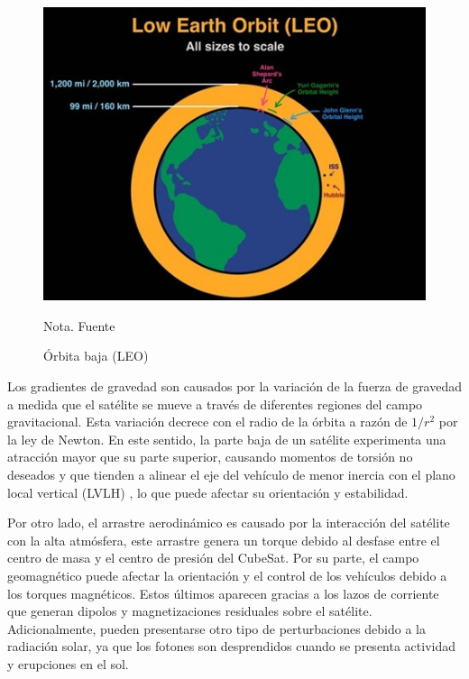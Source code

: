 \begin{figure}[!ht]
	\begin{center}
		\includegraphics[scale=1]{imagenes/marco_teorico/leo.jpg}\\
	\end{center}
	\caption{  Órbita baja (LEO)}
	\label{fig:leo}
		\footnotesize{Nota. Fuente \cite{opc:LEO}}
\end{figure}

Los gradientes de gravedad son causados por la variación de la fuerza de gravedad a medida que el satélite se mueve a través de diferentes regiones del campo gravitacional. Esta variación decrece con el radio de la órbita a razón de $1/r^2$ por la ley de Newton. En este sentido, la parte baja de un satélite experimenta una atracción mayor que su parte superior, causando momentos de torsión no deseados y que tienden a alinear el eje del vehículo de menor inercia con el plano local vertical (LVLH) \cite{griffin2004space}, lo que puede afectar su orientación y estabilidad.

Por otro lado, el arrastre aerodinámico es causado por la interacción del satélite con la alta atmósfera, este arrastre genera un torque debido al desfase entre el centro de masa y el centro de presión del CubeSat. Por su parte, el campo geomagnético puede afectar la orientación y el control de los vehículos debido a los torques magnéticos. Estos últimos aparecen gracias a los lazos de corriente que generan dipolos y magnetizaciones residuales sobre el satélite\cite{Giesselman2006}. Adicionalmente, pueden presentarse otro tipo de perturbaciones debido a la radiación solar, ya que los fotones son desprendidos cuando se presenta actividad y erupciones en el sol.

